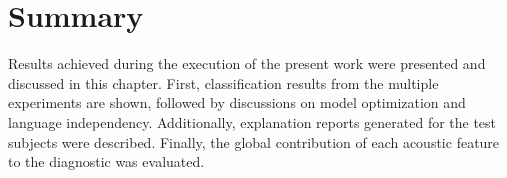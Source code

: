\section{Summary}

Results achieved during the execution of the present work were presented and discussed in this chapter. First, classification results from the multiple experiments are shown, followed by  discussions on model optimization and language independency. Additionally, explanation reports generated for the test subjects were described. Finally, the global contribution of each acoustic feature to the diagnostic was evaluated.